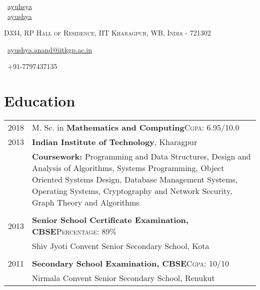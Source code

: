 \documentclass[a4paper,11pt]{extarticle} %
\begin{document}
\pagestyle{empty} %


\begin{multicols}{3}
\normalsize \faGithub\ {\href{https://github.com/ayuhsya}{ayuhsya}}\\
\normalsize  \faLinkedinSquare\ {\href{https://www.linkedin.com/in/ayushya}{ayushya}}\\
\columnbreak
\normalsize\par{\par} %
\par{\centering\footnotesize {\textsc{D334, RP Hall of Residence, IIT Kharagpur, WB, India - 721302}}\hfill\par}
\columnbreak
\raggedright\hfill\normalsize \faEnvelope\ {\href{mailto:ayushya.anand@iitkgp.ac.in}{ayushya.anand@iitkgp.ac.in}}\\
\raggedright\hfill{\faPhone\ +91-7797437135}
\end{multicols}


\vspace{-0.6cm}
\section{Education}

\begin{tabular}{r|p{18.5cm}}	
2018 & M. Sc. in \textbf{Mathematics and Computing}\hfill\textsc{Cgpa}: 6.95/10.0\\
2013&\textbf{Indian Institute of Technology}, Kharagpur\\
& \footnotesize{\textbf{Coursework: }{Programming and Data Structures, Design and Analysis of Algorithms, Systems Programming, Object Oriented Systems Design, Database
Management Systems, Operating Systems, Cryptography and Network Security, Graph Theory and Algorithms}}\\
\multicolumn{2}{c}{} \\
2013 & \textbf{Senior School Certificate Examination, CBSE}\hfill\textsc{Percentage}: 89\%\\
& \footnotesize{Shiv Jyoti Convent Senior Secondary School, Kota}\\
\multicolumn{2}{c}{} \\
2011 & \textbf{Secondary School Examination, CBSE}\hfill\textsc{Cgpa}: 10/10\\
& \footnotesize{Nirmala Convent Senior Secondary School, Renukut}\\
\end{tabular}
\end{document}
